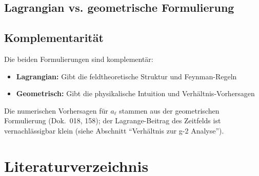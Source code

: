 	\subsection{Lagrangian vs. geometrische Formulierung}
	
	\begin{table}[h]
		\centering
		\caption{Vergleich der Formulierungen}
		\label{tab:comparison}
	\end{table}
	
	\subsection{Komplementarität}
	
	Die beiden Formulierungen sind komplementär:
	\begin{itemize}
		\item \textbf{Lagrangian:} Gibt die feldtheoretische Struktur und Feynman-Regeln
		\item \textbf{Geometrisch:} Gibt die physikalische Intuition und Verhältnis-Vorhersagen
	\end{itemize}
	
	Die numerischen Vorhersagen für $a_\ell$ stammen aus der geometrischen Formulierung (Dok.~018, 158); der Lagrange-Beitrag des Zeitfelds ist vernachlässigbar klein (siehe Abschnitt \enquote{Verhältnis zur g-2 Analyse}).
	
	\section*{Literaturverzeichnis}
	
